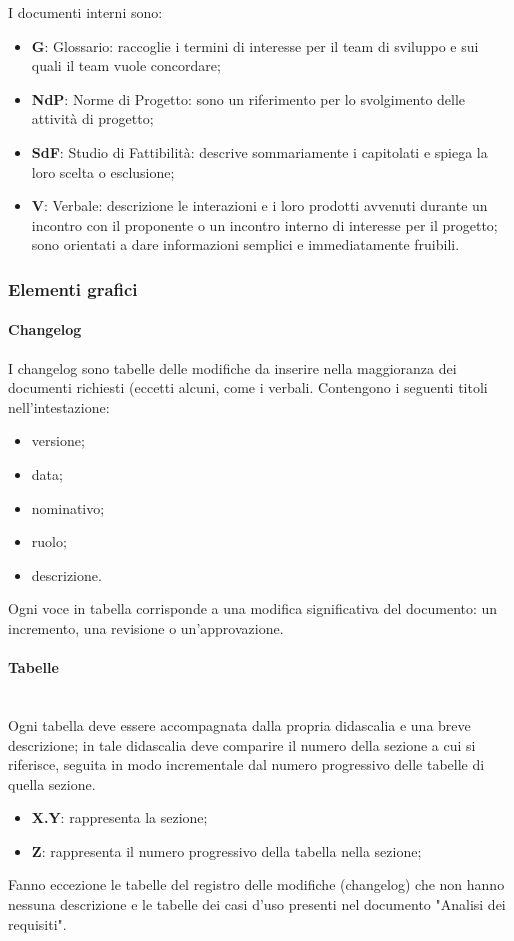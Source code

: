 		I documenti interni sono:
		\begin{itemize}
			\item \textbf{G}: Glossario: raccoglie i termini di interesse per il team di sviluppo e sui quali il team vuole concordare;
			\item \textbf{NdP}: Norme di Progetto: sono un riferimento per lo svolgimento delle attività di progetto;
			\item \textbf{SdF}: Studio di Fattibilità: descrive sommariamente i capitolati e spiega la loro scelta o esclusione;
			\item \textbf{V}: Verbale: descrizione le interazioni e i loro prodotti avvenuti durante un incontro con il proponente o un incontro interno di interesse per il progetto; sono orientati a dare informazioni semplici e immediatamente fruibili. 
		\end{itemize}
		\subsubsection{Elementi grafici}
		\paragraph{Changelog}
		I changelog sono tabelle delle modifiche da inserire nella maggioranza dei documenti richiesti (eccetti alcuni, come i verbali. Contengono i seguenti titoli nell'intestazione:
		\begin{itemize}
			\item versione;
			\item data;
			\item nominativo;
			\item ruolo;
			\item descrizione.
		\end{itemize}
		Ogni voce in tabella corrisponde a una modifica significativa del documento: un incremento, una revisione o un'approvazione.
		\paragraph{Tabelle} \mbox{}\\
		Ogni tabella deve essere accompagnata dalla propria didascalia e una breve descrizione; in tale didascalia deve comparire il numero della sezione a cui si riferisce, seguita in modo incrementale dal numero progressivo delle tabelle di quella sezione.
		\begin{itemize}
			\item \textbf{{X.Y}}: rappresenta la sezione;
			\item \textbf{{Z}}: rappresenta il numero progressivo della tabella nella sezione;
		\end{itemize}
		Fanno eccezione le tabelle del registro delle modifiche (changelog) che non hanno nessuna descrizione e le tabelle dei casi d’uso presenti nel documento
		"Analisi dei requisiti".
